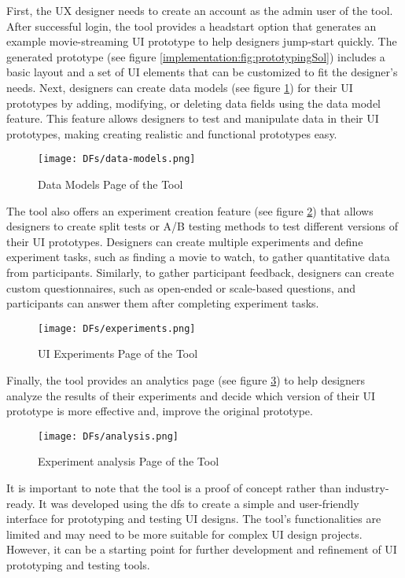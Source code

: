 First, the UX designer needs to create an account as the admin user of the tool. After successful login, the tool provides a headstart option that generates an example movie-streaming UI prototype to help designers jump-start quickly. 
The generated prototype (see figure \ref{implementation:fig:prototypingSol}) includes a basic layout and a set of UI elements that can be customized to fit the designer's needs.
Next, designers can create data models (see figure \ref{implementation:fig:datamodels}) for their UI prototypes by adding, modifying, or deleting data fields using the data model feature. 
This feature allows designers to test and manipulate data in their UI prototypes, making creating realistic and functional prototypes easy.
\begin{figure}[ht]
    \centering
    \texttt{[image: DFs/data-models.png]}
    \caption{Data Models Page of the Tool}
    \label{implementation:fig:datamodels}
\end{figure}
The tool also offers an experiment creation feature (see figure \ref{implementation:fig:experiments}) that allows designers to create split tests or A/B testing methods to test different versions of their UI prototypes. 
Designers can create multiple experiments and define experiment tasks, such as finding a movie to watch, to gather quantitative data from participants.
Similarly, to gather participant feedback, designers can create custom questionnaires, such as open-ended or scale-based questions, and participants can answer them after completing experiment tasks.
\begin{figure}[ht]
    \centering
    \texttt{[image: DFs/experiments.png]}
    \caption{UI Experiments Page of the Tool}
    \label{implementation:fig:experiments}
\end{figure}

Finally, the tool provides an analytics page (see figure \ref{implementation:fig:analysis}) to help designers analyze the results of their experiments and decide which version of their UI prototype is more effective and, improve the original prototype. 
\begin{figure}[ht]
    \centering
    \texttt{[image: DFs/analysis.png]}
    \caption{Experiment analysis Page of the Tool}
    \label{implementation:fig:analysis}
\end{figure}

It is important to note that the tool is a proof of concept rather than industry-ready. 
It was developed using the \ac{df}s to create a simple and user-friendly interface for prototyping and testing UI designs. 
The tool's functionalities are limited and may need to be more suitable for complex UI design projects. 
However, it can be a starting point for further development and refinement of UI prototyping and testing tools.

